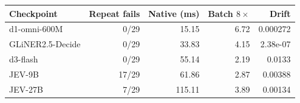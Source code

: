 \begin{tabular}{lrrrr}
\toprule
Checkpoint & Repeat fails & Native (ms) & Batch $8\times$ & Drift \\
\midrule
d1-omni-600M & 0/29 & 15.15 & 6.72 & 0.000272 \\
GLiNER2.5-Decide & 0/29 & 33.83 & 4.15 & 2.38e-07 \\
d3-flash & 0/29 & 55.14 & 2.19 & 0.0133 \\
JEV-9B & 17/29 & 61.86 & 2.87 & 0.00388 \\
JEV-27B & 7/29 & 115.11 & 3.89 & 0.00134 \\
\bottomrule
\end{tabular}
